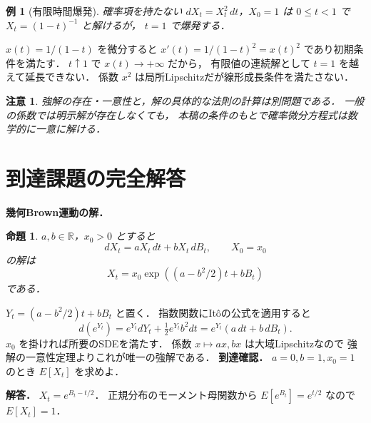 \documentclass[a5paper,10pt,onecolumn]{jsarticle}
\makeatletter
\theoremstyle{mathnotetheorem}
\newtheorem{proposition}[theorem]{命題}
\newtheorem{example}[theorem]{例}
\newtheorem{remark}[theorem]{注意}
\renewcommand{\proofname}{証明}
\renewenvironment{proof}[1][\proofname]{%
  \par\pushQED{\qed}\normalfont\topsep4\p@\@plus2\p@\relax
  \trivlist\item[\hskip\labelsep\bfseries #1]\ignorespaces
}{\popQED\endtrivlist\@endpefalse}
\makeatother
\begin{document}
\begin{example}[有限時間爆発]
確率項を持たない
$dX_t=X_t^2\,dt$，$X_0=1$ は
$0\le t<1$ で $X_t=(1-t)^{-1}$ と解けるが，
$t=1$ で爆発する．
\end{example}
\begin{proof}
$x(t)=1/(1-t)$ を微分すると
$x'(t)=1/(1-t)^2=x(t)^2$ であり初期条件を満たす．
$t\uparrow1$ で $x(t)\to+\infty$ だから，
有限値の連続解として $t=1$ を越えて延長できない．
係数 $x^2$ は局所Lipschitzだが線形成長条件を満たさない．
\end{proof}

\begin{remark}
強解の存在・一意性と，解の具体的な法則の計算は別問題である．
一般の係数では明示解が存在しなくても，
本稿の条件のもとで確率微分方程式は数学的に一意に解ける．
\end{remark}


\section{到達課題の完全解答}
\noindent\textbf{幾何Brown運動の解．}
\begin{proposition}
$a,b\in\mathbb R$，$x_0>0$ とすると
\[
dX_t=aX_t\,dt+bX_t\,dB_t,\qquad X_0=x_0
\]
の解は
\[
X_t=x_0\exp((a-b^2/2)t+bB_t)
\]
である．
\end{proposition}
\begin{proof}
$Y_t=(a-b^2/2)t+bB_t$ と置く．
指数関数にItôの公式を適用すると
\[
d(e^{Y_t})=e^{Y_t}dY_t+
\tfrac12e^{Y_t}b^2dt
=e^{Y_t}(a\,dt+b\,dB_t).
\]
$x_0$ を掛ければ所要のSDEを満たす．
係数 $x\mapsto ax,bx$ は大域Lipschitzなので
強解の一意性定理よりこれが唯一の強解である．
\end{proof}
\noindent\textbf{到達確認．}
$a=0,b=1,x_0=1$ のとき $E[X_t]$ を求めよ．
\par\noindent\textbf{解答．}
$X_t=e^{B_t-t/2}$．
正規分布のモーメント母関数から
$E[e^{B_t}]=e^{t/2}$ なので $E[X_t]=1$．
\end{document}
